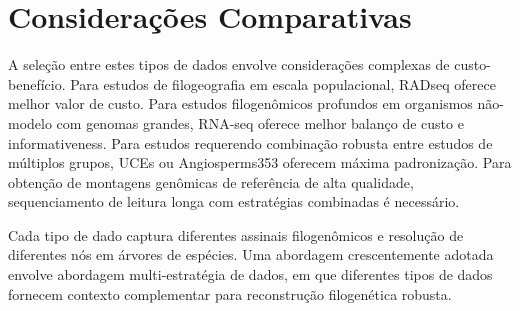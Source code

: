 \textcite{fan2015, dylus2024, balaban2025}

\section{Considerações Comparativas}

A seleção entre estes tipos de dados envolve considerações complexas de custo-benefício. Para estudos de filogeografia em escala populacional, RADseq oferece melhor valor de custo. Para estudos filogenômicos profundos em organismos não-modelo com genomas grandes, RNA-seq oferece melhor balanço de custo e informativeness. Para estudos requerendo combinação robusta entre estudos de múltiplos grupos, UCEs ou Angiosperms353 oferecem máxima padronização. Para obtenção de montagens genômicas de referência de alta qualidade, sequenciamento de leitura longa com estratégias combinadas é necessário.

Cada tipo de dado captura diferentes assinais filogenômicos e resolução de diferentes nós em árvores de espécies. Uma abordagem crescentemente adotada envolve abordagem multi-estratégia de dados, em que diferentes tipos de dados fornecem contexto complementar para reconstrução filogenética robusta.

